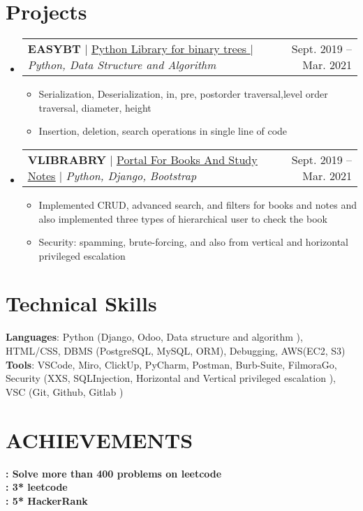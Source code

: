 \documentclass[letterpaper,11pt]{article}
\makeatletter
\newcommand{\resumeItem}[1]{
  \item\small{
    {#1 \vspace{-2pt}}
  }
}
\newcommand{\resumeProjectHeading}[2]{
    \item
    \begin{tabular*}{0.97\textwidth}{l@{\extracolsep{\fill}}r}
      \small#1 & #2 \\
    \end{tabular*}\vspace{-7pt}
}
\newcommand{\resumeSubHeadingListStart}{\begin{itemize}[leftmargin=0.15in, label={}]}
\newcommand{\resumeSubHeadingListEnd}{\end{itemize}}
\newcommand{\resumeItemListStart}{\begin{itemize}}
\newcommand{\resumeItemListEnd}{\end{itemize}\vspace{-5pt}}
\makeatother
\begin{document}
\section{Projects}
    \resumeSubHeadingListStart
      \resumeProjectHeading
          {\textbf{EASYBT} { | }\href{https://github.com/EasyBinaryTree/EasyBT} {\underline{Python Library for binary trees }} $|$ 
          \emph{Python, Data Structure and Algorithm }}{Sept. 2019 -- Mar. 2021}
          \resumeItemListStart
            \resumeItem{Serialization, Deserialization, in, pre, postorder traversal,level order
traversal, diameter, height}
            \resumeItem{Insertion, deletion, search operations in  single line of code}
            \resumeItemListEnd
      \resumeProjectHeading
          {\textbf{VLIBRABRY}
          { | } \href{https://github.com/samirpatil2000/VITLibrary}{\underline{Portal For Books And Study Notes}} {} $|$ \emph{Python, Django, Bootstrap}}{Sept. 2019 -- Mar. 2021}
          \resumeItemListStart
            \resumeItem{Implemented CRUD, advanced search, and filters for books and notes and also implemented three types of hierarchical user to check the book}
            \resumeItem{{Security}: spamming, brute-forcing, and also from vertical and horizontal privileged escalation}
             \resumeItemListEnd
    \resumeSubHeadingListEnd 


%
\section{Technical Skills}
 \begin{itemize}[leftmargin=0.15in, label={}]
    \small{\item{
     \textbf{Languages}{: Python (Django, Odoo, Data structure and algorithm ),  HTML/CSS, DBMS (PostgreSQL, MySQL, ORM), Debugging, AWS(EC2, S3)} \\
    \textbf{Tools}{: VSCode, Miro, ClickUp, PyCharm, Postman,  Burb-Suite, FilmoraGo, Security (XXS, SQLInjection, Horizontal and Vertical privileged escalation ), VSC (Git, Github, Gitlab )} \\
   }}
 \end{itemize}
 
\section{ACHIEVEMENTS}
 \begin{itemize}[leftmargin=0.15in, label={}]
    \small{\item{
     \textbf{: Solve more than 400 problems on leetcode } \\
     \textbf{: 3* leetcode } \\
     \textbf{: 5* HackerRank } \\
   }}
 \end{itemize}


\end{document}
